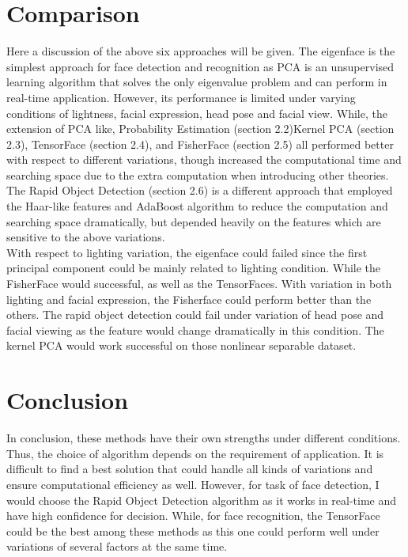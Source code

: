\documentclass[12pt, a4paper, twoside]{article}
\begin{document}
\section{Comparison}
Here a discussion of the above six approaches will be given. The eigenface is the simplest approach for face detection and recognition as PCA is an unsupervised learning algorithm that solves the only eigenvalue problem and can perform in real-time application. However, its performance is limited under varying conditions of lightness, facial expression, head pose and facial view. While, the extension of PCA like, Probability Estimation (section 2.2)Kernel PCA (section 2.3), TensorFace (section 2.4), and FisherFace (section 2.5) all performed better with respect to different variations, though increased the computational time and searching space due to the extra computation when introducing other theories. The Rapid Object Detection (section 2.6) is a different approach that employed the Haar-like features and AdaBoost algorithm to reduce the computation and searching space dramatically, but depended heavily on the features which are sensitive to the above variations. \\
With respect to lighting variation, the eigenface could failed since the first principal component could be mainly related to lighting condition. While the FisherFace would successful, as well as the TensorFaces. With variation in both lighting and facial expression, the Fisherface could perform better than the others. The rapid object detection could fail under variation of head pose and facial viewing as the feature would change dramatically in this condition. The kernel PCA would work successful on those nonlinear separable dataset.

\section{Conclusion}
In conclusion, these methods have their own strengths under different conditions. Thus, the choice of algorithm depends on the requirement of application. It is difficult to find a best solution that could handle all kinds of variations and ensure computational efficiency as well. However, for task of face detection, I would choose the Rapid Object Detection algorithm as it works in real-time and have high confidence for decision. While, for face recognition, the TensorFace could be the best among these methods as this one could perform well under variations of several factors at the same time.  




\end{document}
